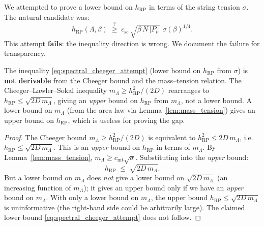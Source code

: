 We attempted to prove a lower bound on $h_{\mathrm{RP}}$ in terms
of the string tension $\sigma$. The natural candidate was:
\begin{equation}
\label{eq:spectral_cheeger_attempt}
  h_{\mathrm{RP}}(\Lambda,\beta)\;\stackrel{?}{\ge}\;
  c_{\mathrm{sc}}\,\sqrt{\beta\,N\,|P_{t}|}\;\sigma(\beta)^{1/4}.
\end{equation}
This attempt \textbf{fails}: the inequality direction is wrong.
We document the failure for transparency.

\begin{theorem}
\label{thm:spectral_cheeger_attempt}
The inequality \eqref{eq:spectral_cheeger_attempt} (lower bound on
$h_{\mathrm{RP}}$ from $\sigma$) is \textbf{not derivable} from
the Cheeger bound and the mass--tension relation. The Cheeger--Lawler--Sokal
inequality $m_{\Lambda}\ge h_{\mathrm{RP}}^{2}/(2D)$ rearranges to
$h_{\mathrm{RP}}\le\sqrt{2D\,m_{\Lambda}}$, giving an
\emph{upper} bound on $h_{\mathrm{RP}}$ from $m_{\Lambda}$, not a
lower bound. A lower bound on $m_{\Lambda}$ (from the area law via
Lemma~\ref{lem:mass_tension}) gives an upper bound on
$h_{\mathrm{RP}}$, which is useless for proving the gap.
\end{theorem}

\begin{proof}
The Cheeger bound $m_{\Lambda}\ge h_{\mathrm{RP}}^{2}/(2D)$ is
equivalent to $h_{\mathrm{RP}}^{2}\le 2D\,m_{\Lambda}$, i.e.\
$h_{\mathrm{RP}}\le\sqrt{2D\,m_{\Lambda}}$. This is an
\emph{upper} bound on $h_{\mathrm{RP}}$ in terms of $m_{\Lambda}$.
By Lemma~\ref{lem:mass_tension}, $m_{\Lambda}\ge
c_{\mathrm{mt}}\sqrt{\sigma}$. Substituting into the
\emph{upper} bound:
\[
  h_{\mathrm{RP}}\;\le\;\sqrt{2D\,m_{\Lambda}}.
\]
But a lower bound on $m_{\Lambda}$ does \emph{not} give a lower
bound on $\sqrt{2D\,m_{\Lambda}}$ (an increasing function of
$m_{\Lambda}$); it gives an upper bound only if we have an
\emph{upper} bound on $m_{\Lambda}$. With only a lower bound on
$m_{\Lambda}$, the upper bound $h_{\mathrm{RP}}\le\sqrt{2D\,m_{\Lambda}}$
is uninformative (the right-hand side could be arbitrarily large).
The claimed lower bound \eqref{eq:spectral_cheeger_attempt} does
not follow.
\end{proof}

